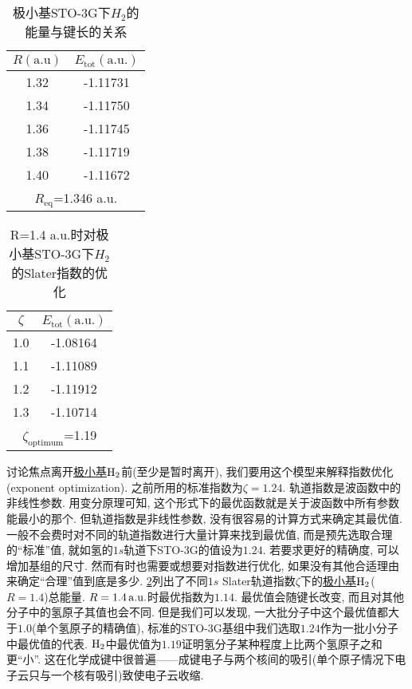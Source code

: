 \begin{table}[H]
	\centering
	\caption{极小基STO-3G下$H_2$的能量与键长的关系}
	\begin{tabular}{cc}
		\hline
		$R \mathrm{(a.u)}$ & $E_\mathrm{tot}\mathrm{(a.u.)}$\\\hline
		1.32      & -1.11731\\
		1.34     & -1.11750\\
		1.36     & -1.11745\\
		1.38     & -1.11719\\
		1.40     & -1.11672\\\hline
		\multicolumn{2}{c}{$R_\mathrm{eq}$=1.346 a.u.}
	\end{tabular}
	\label{t3.2}
\end{table}
\begin{table}[H]
	\centering
	\caption{R=1.4 a.u.时对极小基STO-3G下$H_2$的Slater指数的优化}
	\begin{tabular}{cc}
		\hline
		$\zeta$ & $E_\mathrm{tot} \mathrm{(a.u.)}$\\\hline
		1.0      & -1.08164\\
		1.1     & -1.11089\\
		1.2     & -1.11912\\
		1.3     & -1.10714\\\hline
		\multicolumn{2}{c}{$\zeta_\mathrm{optimum}$=1.19}
	\end{tabular}
	\label{t3.3}
\end{table}
讨论焦点离开\underline{极小基$\mathrm{H}_2$}前(至少是暂时离开), 
我们要用这个模型来解释指数优化(exponent optimization). 
之前所用的标准指数为$\zeta=1.24$. 
轨道指数是波函数中的非线性参数. 
用变分原理可知, 
这个形式下的最优函数就是关于波函数中所有参数能最小的那个. 
但轨道指数是非线性参数, 
没有很容易的计算方式来确定其最优值. 
一般不会费时对不同的轨道指数进行大量计算来找到最优值, 
而是预先选取合理的``标准''值, 
就如氢的$1s$轨道下STO-3G的值设为$1.24$. 
若要求更好的精确度, 
可以增加基组的尺寸. 
然而有时也需要或想要对指数进行优化, 
如果没有其他合适理由来确定``合理''值到底是多少. 
\ref{t3.3}列出了不同$1s$ Slater轨道指数$\zeta$下的\underline{极小基$\mathrm{H}_2$}($R=1.4$)总能量. 
$R=1.4\,\mathrm{a.u.}$时最优指数为$1.14$. 
最优值会随键长改变, 
而且对其他分子中的氢原子其值也会不同. 
但是我们可以发现, 
一大批分子中这个最优值都大于$1.0$(单个氢原子的精确值), 
标准的STO-3G基组中我们选取$1.24$作为一批小分子中最优值的代表. 
$\mathrm{H}_2$中最优值为$1.19$证明氢分子某种程度上比两个氢原子之和更``小”. 
这在化学成键中很普遍——成键电子与两个核间的吸引(单个原子情况下电子云只与一个核有吸引)致使电子云收缩. 

